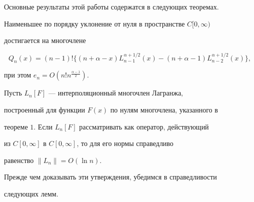 Основные результаты этой работы содержатся в следующих теоремах.





\begin{thm}


Наименьшее по порядку уклонение от нуля в пространстве $C[0,\infty)$


достигается на многочлене


$$


Q_n(x)=(n-1)!\{(n+\alpha-x)L^{\alpha+1/2}_{n-1}(x)-


(n+\alpha-1)L^{\alpha+1/2}_{n-2}(x)\},


$$


при этом $e_n=O(n!n^{\frac{\alpha-1}{2}})$.


\end{thm}





\begin{thm}


Пусть $L_n[F]$ --- интерполяционный многочлен Лагранжа,


построенный для функции $F(x)$ по нулям многочлена, указанного в


теореме $1$. Если $L_n[F]$ рассматривать как оператор, действующий 


из $C[0,\infty]$ в $C[0,\infty]$, то для его нормы справедливо 


равенство $\|L_n\|=O(\ln n)$. 


\end{thm}





Прежде чем доказывать эти утверждения, убедимся в справедливости


следующих лемм.





 


